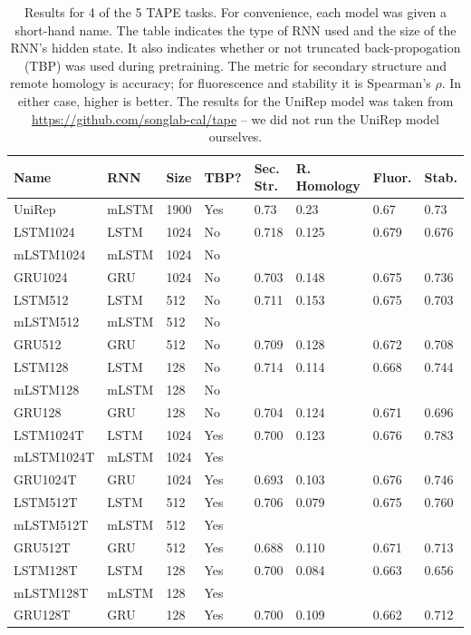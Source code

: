 \documentclass[a4paper,12pt]{article}
\begin{document}
\begin{table}[ht]
\begin{tabularx}{\linewidth}{Llllllll}
\toprule
\textbf{Name} & \textbf{RNN} & \textbf{Size} & \textbf{TBP?} & \textbf{Sec. Str.} & \textbf{R. Homology} & \textbf{Fluor.} & \textbf{Stab.} \\ \hline
UniRep     & mLSTM & 1900 & Yes  & 0.73   & 0.23  & 0.67  & 0.73  \\
LSTM1024   & LSTM  & 1024 & No   & 0.718  & 0.125 & 0.679 & 0.676 \\
mLSTM1024  & mLSTM & 1024 & No   &        &       &       &       \\
GRU1024    & GRU   & 1024 & No   & 0.703  & 0.148 & 0.675 & 0.736 \\
LSTM512    & LSTM  & 512  & No   & 0.711  & 0.153 & 0.675 & 0.703 \\
mLSTM512   & mLSTM & 512  & No   &        &       &       &       \\
GRU512     & GRU   & 512  & No   & 0.709  & 0.128 & 0.672 & 0.708 \\
LSTM128    & LSTM  & 128  & No   & 0.714  & 0.114 & 0.668 & 0.744 \\
mLSTM128   & mLSTM & 128  & No   &        &       &       &       \\
GRU128     & GRU   & 128  & No   & 0.704  & 0.124 & 0.671 & 0.696 \\
LSTM1024T  & LSTM  & 1024 & Yes  & 0.700  & 0.123 & 0.676 & 0.783 \\
mLSTM1024T & mLSTM & 1024 & Yes  &        &       &       &       \\
GRU1024T   & GRU   & 1024 & Yes  & 0.693  & 0.103 & 0.676 & 0.746 \\
LSTM512T   & LSTM  & 512  & Yes  & 0.706  & 0.079 & 0.675 & 0.760 \\
mLSTM512T  & mLSTM & 512  & Yes  &        &       &       &       \\
GRU512T    & GRU   & 512  & Yes  & 0.688  & 0.110 & 0.671 & 0.713 \\
LSTM128T   & LSTM  & 128  & Yes  & 0.700  & 0.084 & 0.663 & 0.656 \\
mLSTM128T  & mLSTM & 128  & Yes  &        &       &       &       \\
GRU128T    & GRU   & 128  & Yes  & 0.700  & 0.109 & 0.662 & 0.712 \\ \bottomrule
\end{tabularx}
\caption{Results for 4 of the 5 TAPE tasks. For convenience, each model was given a short-hand name. The table indicates the type of RNN used and the size of the RNN's hidden state. It also indicates whether or not truncated back-propogation (TBP) was used during pretraining. The metric for secondary structure and remote homology is accuracy; for fluorescence and stability it is Spearman's $\rho$. In either case, higher is better. The results for the UniRep model was taken from \url{https://github.com/songlab-cal/tape} -- we did not run the UniRep model ourselves.}
\label{table:taperesults}
\end{table}
\end{document}
